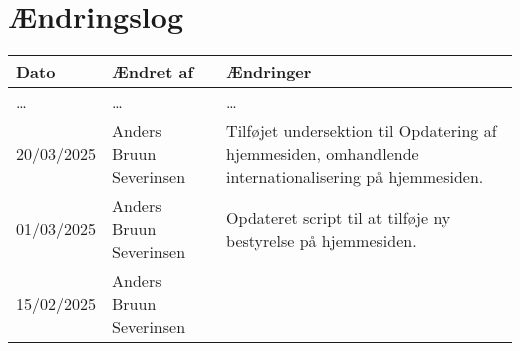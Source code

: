 \section{Ændringslog}
\label{sec:changelog}

\begin{tabular}{l l l}
    \textbf{Dato} & \textbf{Ændret af} & \textbf{Ændringer} \\
    \hline
    \begin{minipage}[t]
        {0.15\linewidth}
        \dots
    \end{minipage} &
    \begin{minipage}[t]
        {0.35\linewidth}
        \dots
    \end{minipage} & 
    \begin{minipage}[t]
        {0.5\linewidth}
        \dots
    \end{minipage} \\
    \hline
    \begin{minipage}[t]
        {0.15\linewidth}
        20/03/2025
    \end{minipage} &
    \begin{minipage}[t]
        {0.35\linewidth}
        Anders Bruun Severinsen
    \end{minipage} & 
    \begin{minipage}[t]
        {0.5\linewidth}
        Tilføjet undersektion til Opdatering af hjemmesiden, omhandlende 
        internationalisering på hjemmesiden.
    \end{minipage} \\
    \hline
    \begin{minipage}[t]
        {0.15\linewidth}
        01/03/2025
    \end{minipage} &
    \begin{minipage}[t]
        {0.35\linewidth}
        Anders Bruun Severinsen
    \end{minipage} & 
    \begin{minipage}[t]
        {0.5\linewidth}
        Opdateret script til at tilføje ny bestyrelse på hjemmesiden.
    \end{minipage} \\
    \hline
    \begin{minipage}[t]
        {0.15\linewidth}
        15/02/2025
    \end{minipage} &
    \begin{minipage}[t]
        {0.35\linewidth}
        Anders Bruun Severinsen
    \end{minipage} & 

\end{tabular}

